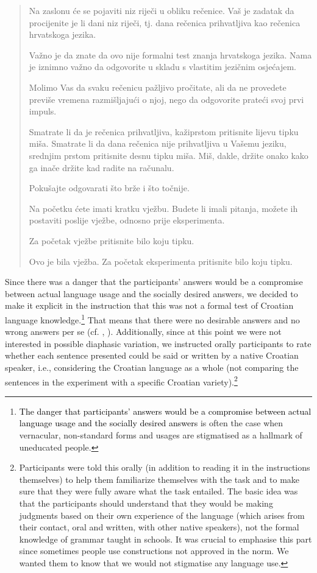 \begin{quotation}
Na zaslonu će se pojaviti niz riječi u obliku rečenice. Vaš je zadatak da procijenite je li dani niz riječi, tj. dana rečenica prihvatljiva kao rečenica hrvatskoga jezika. 

Važno je da znate da ovo nije formalni test znanja hrvatskoga jezika. Nama je iznimno važno da odgovorite u skladu s vlastitim jezičnim osjećajem. 

Molimo Vas da svaku rečenicu pažljivo pročitate, ali da ne provedete previše vremena razmišljajući o njoj, nego da odgovorite prateći svoj prvi impuls. 

Smatrate li da je rečenica prihvatljiva, kažiprstom pritisnite lijevu tipku miša. Smatrate li da dana rečenica nije prihvatljiva u Vašemu jeziku, srednjim prstom pritisnite desnu tipku miša. Miš, dakle, držite onako kako ga inače držite kad radite na računalu. 

Pokušajte odgovarati što brže i što točnije. 

Na početku ćete imati kratku vježbu. Budete li imali pitanja, možete ih postaviti poslije vježbe, odnosno prije eksperimenta.

Za početak vježbe pritisnite bilo koju tipku.

\center{*******}

Ovo je bila vježba. Za početak eksperimenta pritisnite bilo koju tipku.
\end{quotation}

Since there was a danger that the participants’ answers would be a compromise between actual language usage and the socially desired answers, we decided to make it explicit in the instruction that this was not a formal test of Croatian language knowledge.\footnote{\textcolor{black}{The danger that participants’ answers would be a compromise between actual language usage and the socially desired answers} is often the case when vernacular, non-standard forms and usages are stigmatised as a hallmark of uneducated people.} That means that there were no desirable answers and no wrong answers per se (cf. \citealt[][75]{KrugSell13}, \citealt[][103]{Hoffmann13}). Additionally, since at this point we were not interested in possible diaphasic variation, we instructed orally participants to rate whether each sentence presented could be said or written by a native Croatian speaker, i.e., considering the Croatian language as a whole (not comparing the sentences in the experiment with a specific Croatian variety).\footnote{Participants were told this orally (in addition to reading it in the instructions themselves) to help them familiarize themselves with the task and to make sure that they were fully aware what the task entailed. The basic idea was that the participants should understand that they would be making judgments based on their own experience of the language (which arises from their contact, oral and written, with other native speakers), not the formal knowledge of grammar taught in schools. It was crucial to emphasise this part since sometimes people use constructions not approved in the norm. We wanted them to know that we would not stigmatise any language use.} 


